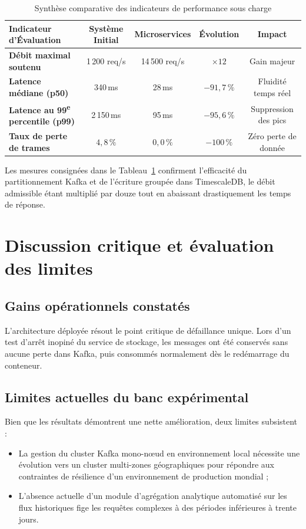 \begin{table}[H]
\centering
\begin{tabularx}{\textwidth}{X c c c c}
\toprule
\textbf{Indicateur d'\'Evaluation} & \textbf{Syst\`eme Initial} & \textbf{Microservices} & \textbf{\'Evolution} & \textbf{Impact} \\
\midrule
\textbf{D\'ebit maximal soutenu}       & 1\,200 req/s              & 14\,500 req/s          & $\times 12$          & Gain majeur \\
\textbf{Latence m\'ediane (p50)}      & 340\,ms                   & 28\,ms                 & $-91{,}7\,\%$        & Fluidit\'e temps r\'eel \\
\textbf{Latence au 99\textsuperscript{e} percentile (p99)} & 2\,150\,ms & 95\,ms & $-95{,}6\,\%$ & Suppression des pics \\
\textbf{Taux de perte de trames}      & $4{,}8\,\%$               & $0{,}0\,\%$            & $-100\,\%$           & Z\'ero perte de donn\'ee \\
\bottomrule
\end{tabularx}
\caption{Synth\`ese comparative des indicateurs de performance sous charge}
\label{tab:resultats-metriques}
\end{table}

Les mesures consign\'ees dans le Tableau~\ref{tab:resultats-metriques} confirment l'efficacit\'e du partitionnement Kafka et de l'\'ecriture group\'ee dans TimescaleDB, le d\'ebit admissible \'etant multipli\'e par douze tout en abaissant drastiquement les temps de r\'eponse.

\section{Discussion critique et \'evaluation des limites}
\subsection{Gains op\'erationnels constat\'es}
L'architecture d\'eploy\'ee r\'esout le point critique de d\'efaillance unique. Lors d'un test d'arr\^et inopin\'e du service de stockage, les messages ont \'et\'e conserv\'es sans aucune perte dans Kafka, puis consomm\'es normalement d\`es le red\'emarrage du conteneur.

\subsection{Limites actuelles du banc exp\'erimental}
Bien que les r\'esultats d\'emontrent une nette am\'elioration, deux limites subsistent :
\begin{itemize}
    \item La gestion du cluster Kafka mono-n\oe ud en environnement local n\'ecessite une \'evolution vers un cluster multi-zones g\'eographiques pour r\'epondre aux contraintes de r\'esilience d'un environnement de production mondial ;
    \item L'absence actuelle d'un module d'agr\'egation analytique automatis\'e sur les flux historiques fige les requ\^etes complexes \`a des p\'eriodes inf\'erieures \`a trente jours.
\end{itemize}

